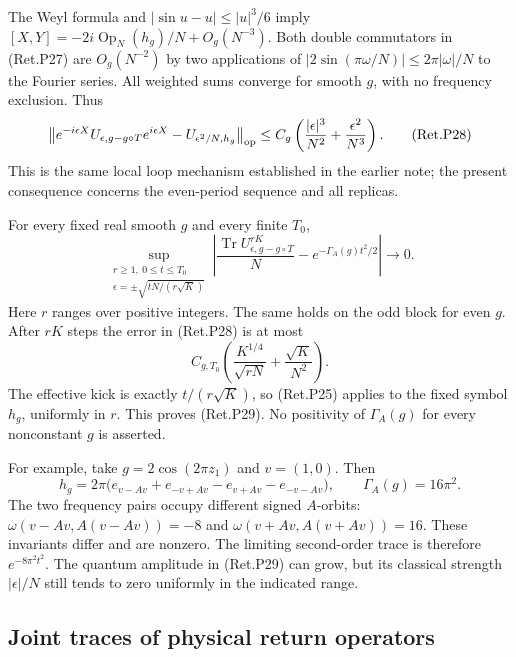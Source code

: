 The Weyl formula and \(|\sin u-u|\le|u|^3/6\) imply
\([X,Y]=-2i\operatorname{Op}_N(h_g)/N+O_g(N^{-3})\).
Both double commutators in (Ret.P27) are \(O_g(N^{-2})\) by two applications
of \(|2\sin(\pi\omega/N)|\le2\pi|\omega|/N\) to the Fourier series.
All weighted sums converge for smooth \(g\), with no frequency exclusion.
Thus
\[
 \left\|e^{-i\epsilon X}U_{\epsilon,g-g\circ T}e^{i\epsilon X}
                             -U_{\epsilon^2/N,h_g}\right\|_{\rm op}
       \le C_g\left(\frac{|\epsilon|^3}{N^2}
                                +\frac{\epsilon^2}{N^3}\right). \tag{Ret.P28}
\]
This is the same local loop mechanism established in the earlier note;
the present consequence concerns the even-period sequence and all replicas.

\begin{theorem}\label{pass1:return_periodic-7} For every fixed real
smooth \(g\) and every finite \(T_0\),
\[
 \sup_{\substack{r\ge1,\ 0\le t\le T_0\\
                 \epsilon=\pm\sqrt{tN/(r\sqrt K)}}}
 \left|\frac{\operatorname{Tr}U_{\epsilon,g-g\circ T}^{rK}}N
                            -e^{-\Gamma_A(g)t^2/2}\right|\to0. \tag{Ret.P29}
\]
Here \(r\) ranges over positive integers. The same holds on the odd block
for even \(g\).
After \(rK\) steps the error in (Ret.P28) is at most
\[
 C_{g,T_0}\left(\frac{K^{1/4}}{\sqrt{rN}}
                                  +\frac{\sqrt K}{N^2}\right).
\]
The effective kick is exactly \(t/(r\sqrt K)\), so (Ret.P25) applies to
the fixed symbol \(h_g\), uniformly in \(r\). This proves (Ret.P29).
No positivity of \(\Gamma_A(g)\) for every nonconstant \(g\) is asserted.
\end{theorem}

For example, take \(g=2\cos(2\pi z_1)\) and \(v=(1,0)\). Then
\[
 h_g=2\pi\bigl(e_{v-Av}+e_{-v+Av}-e_{v+Av}-e_{-v-Av}\bigr),
 \qquad \Gamma_A(g)=16\pi^2.                               \tag{Ret.P30}
\]
The two frequency pairs occupy different signed \(A\)-orbits:
\(\omega(v-Av,A(v-Av))=-8\) and
\(\omega(v+Av,A(v+Av))=16\). These invariants differ and are nonzero.
The limiting second-order trace is therefore \(e^{-8\pi^2t^2}\).
The quantum amplitude in (Ret.P29) can grow, but its classical strength
\(|\epsilon|/N\) still tends to zero uniformly in the indicated range.

\hypertarget{joint-traces-of-physical-return-operators}{%
\subsection{Joint traces of physical return operators}\label{joint-traces-of-physical-return-operators}}

